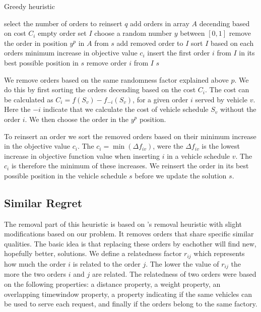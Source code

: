 \documentclass[../main.tex]{subfiles}
\begin{document}
\begin{algorithm}
    \caption{Greedy heuristic}\label{alg:greedy}
    \begin{algorithmic}[1]
        \State select the number of orders to reinsert $q$
        \State add orders in array $A$ decending based on cost $C_i$
        \State empty order set $I$
        \Repeat
            \State choose a random number $y$ between $[0,1]$
            \State remove the order in position $y^p$ in $A$ from $s$ 
            \State add removed order to $I$
        \Repeat
            \State sort $I$ based on each orders minimum increase in objective value $c_i$
            \State insert the first order $i$ from $I$ in its best possible position in $s$
            \State remove order $i$ from $I$
        \State
        \Return $s$
        \EndFunction
    \end{algorithmic}
\end{algorithm}

We remove orders based on the same randomness factor explained above $p$. 
We do this by first sorting the orders decending based on the cost $C_i$. The cost can be calculated as $C_i=f(S_v) - f_{-i}(S_v)$, for a given order $i$ served by vehicle $v$. 
Here the $-i$ indicate that we calculate the cost of vehicle schedule $S_v$ without the order $i$.
We then choose the order in the $y^p$ position. \par

To reinsert an order we sort the removed orders based on their minimum increase in the objective value $c_i$.
The $c_i = \min(\Delta f_{iv})$, were the $\Delta f_{iv}$ is the lowest increase in objective function value when inserting $i$ in a vehicle schedule $v$. 
The $c_i$ is therefore the minimum of these increases. 
We reinsert the order in its best possible position in the vehicle schedule $s$ before we update the solution $s$. 

\subsection{Similar Regret}
\label{sec:shaw}
The removal part of this heuristic is based on \citet{shaw97}'s removal heuristic with slight modifications based on our problem. 
It removes orders that share specific similar qualities. 
The basic idea is that replacing these orders by eachother will find new, hopefully better, solutions. 
We define a relatedness factor $r_{ij}$ which represents how much the order $i$ is related to the order $j$. 
The lower the value of $r_{ij}$ the more the two orders $i$ and $j$ are related.
The relatedness of two orders were based on the following properties: 
a distance property, a weight property, an overlapping timewindow property, a property indicating if the same vehicles can be used to serve each request, and finally if the orders belong to the same factory.
\end{document}
